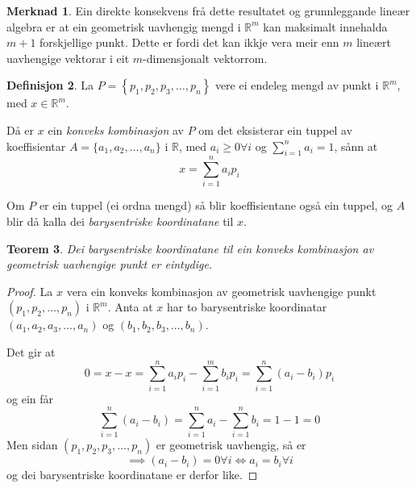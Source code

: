 \documentclass[a4paper, 12pt, norsk]{article}
\theoremstyle{plain}
\newtheorem{theorem}{Teorem}[section]
\theoremstyle{definition}
\newtheorem{definition}[theorem]{Definisjon}
\newtheorem{remark}[theorem]{Merknad}
\newcommand{\Rb}{\mathbb{R}}
\newcommand{\set}[1]{ \left\{ #1 \right\} } %
\newcommand{\tuple}[1]{ \left( #1 \right) } %
\begin{document}
\begin{remark}
	Ein direkte konsekvens frå dette resultatet og grunnleggande lineær algebra er at ein geometrisk uavhengig mengd i $\Rb^m$ kan maksimalt innehalda $m+1$ forskjellige punkt. Dette er fordi det kan ikkje vera meir enn $m$ lineært uavhengige vektorar i eit $m$-dimensjonalt vektorrom.
\end{remark}

\begin{definition}
	La \( P = \set{p_1, p_2, p_3, \dots, p_n} \) vere ei endeleg mengd av punkt i \( \Rb^m \), med \( x\in\Rb^m \).

	Då er \( x \) ein \emph{konveks kombinasjon} av \( P \) om det eksisterar ein tuppel av koeffisientar \( A=\{a_1, a_2, \dots, a_n\} \) i \( \Rb \), med \( a_i\geq0\forall i \) og \( \sum_{i=1}^n a_i = 1\), sånn at
	\[
		x=\sum_{i=1}^n a_ip_i
	\]
	
	Om $P$ er ein tuppel (ei ordna mengd) så blir koeffisientane også ein tuppel, og $A$ blir då kalla dei \emph{barysentriske koordinatane} til $x$.
\end{definition}

\begin{theorem} \label{thm:unik-barysentrisk-koordinat}
	Dei barysentriske koordinatane til ein konveks kombinasjon av geometrisk uavhengige punkt er eintydige.
\end{theorem}

\begin{proof}
	La $x$ vera ein konveks kombinasjon av geometrisk uavhengige punkt \( \tuple{p_1, p_2, \dots, p_n} \) i $\Rb^m$. Anta at $x$ har to barysentriske koordinatar $(a_1, a_2, a_3, \dots, a_n)$ og $(b_1, b_2, b_3, \dots, b_n)$. 
	
	Det gir at
	\begin{equation*}
		0 = x - x = \sum_{i=1}^n a_ip_i - \sum_{i=1}^m b_ip_i=\sum_{i=1}^n (a_i-b_i)p_i
	\end{equation*}
	og ein får
	\begin{equation*}
		\sum_{i=1}^n(a_i-b_i)=\sum_{i=1}^na_i - \sum_{i=1}^nb_i = 1 - 1 = 0
	\end{equation*}
	Men sidan $(p_1, p_2, p_3, \dots, p_n)$ er geometrisk uavhengig, så er
	\begin{equation*}
		\implies (a_i-b_i)=0\forall i \Longleftrightarrow a_i = b_i \forall i
	\end{equation*}
	og dei barysentriske koordinatane er derfor like.
\end{proof}
\end{document}
